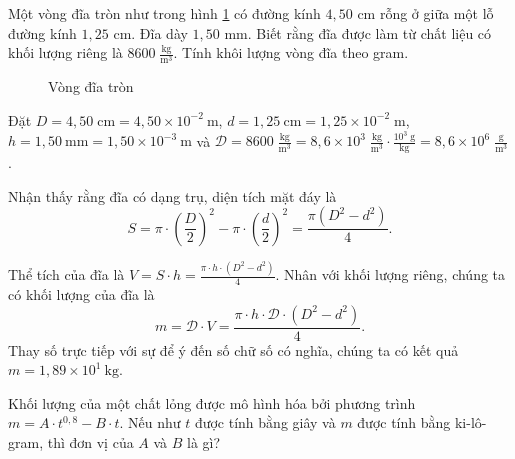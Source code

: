 \documentclass[a4paper, titlepage, openany]{book}
\newcounter{exercise}
\newcounter{solution}
\numberwithin{equation}{chapter}
\begin{document}
\exercise Một vòng đĩa tròn như trong hình \ref{fig:vong_dia} có đường kính $4{,}50$ cm rỗng ở giữa một lỗ đường kính $1{,}25$ cm. Đĩa dày $1{,}50$ mm. Biết rằng đĩa được làm từ chất liệu có khối lượng riêng là $8600\;\frac{\text{kg}}{\text{m}^3}$. Tính khôi lượng vòng đĩa theo gram.

\begin{figure}
   \centering
   \caption{Vòng đĩa tròn}
   \label{fig:vong_dia}
\end{figure}

\solution

Đặt $D=4{,}50\;\text{cm}=4{,}50\times 10^{-2}\ \text{m}$, $d=1{,}25\ \text{cm}=1{,}25\times 10^{-2}\;\text{m}$, $h=1{,}50\ \text{mm}=1{,}50\times 10^{-3}\ \text{m}$ và $\mathcal{D}=8600\;\frac{\text{kg}}{\text{m}^3}=8{,}6\times 10^3\;\frac{\text{kg}}{\text{m}^3}\cdot \frac{10^3\;\text{g}}{\text{kg}}=8{,}6\times 10^6\;\frac{\text{g}}{\text{m}^3}$.

Nhận thấy rằng đĩa có dạng trụ, diện tích mặt đáy là $$S=\pi\cdot \left(\frac{D}{2}\right)^2-\pi\cdot \left(\frac{d}{2}\right)^2=\frac{\pi \left(D^2-d^2\right)}{4}.$$

Thể tích của đĩa là $V=S\cdot h=\frac{\pi \cdot h\cdot \left(D^2-d^2\right)}{4}.$ Nhân với khối lượng riêng, chúng ta có khối lượng của đĩa là $$m=\mathcal{D}\cdot V=\frac{\pi \cdot h\cdot \mathcal{D}\cdot \left(D^2-d^2\right)}{4}.$$ Thay số trực tiếp với sự để ý đến số chữ số có nghĩa, chúng ta có kết quả $m=\boxed{1{,}89\times 10^1\ \text{kg}}$.

\exercise Khối lượng của một chất lỏng được mô hình hóa bởi phương trình $m=A\cdot t^{0{,}8}-B\cdot t$. Nếu như $t$ được tính bằng giây và $m$ được tính bằng ki-lô-gram, thì đơn vị của $A$ và $B$ là gì?
\end{document}
